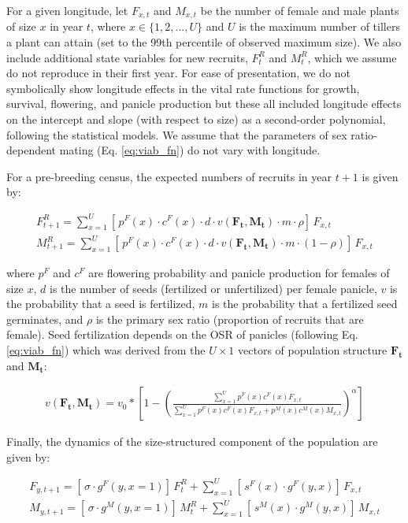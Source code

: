 \documentclass[11pt]{article}\usepackage[]{graphicx}\usepackage[]{color}
\begin{document}
For a given longitude, let $F_{x,t}$ and $M_{x,t}$ be the number of female and male plants of size $x$ in year $t$, where $x \in \{1,2,...,U\}$ and $U$ is the maximum number of tillers a plant can attain (set to the 99th percentile of observed maximum size). 
We also include additional state variables for new recruits, $F^{R}_{t}$ and $M^{R}_{t}$, which we assume do not reproduce in their first year.
For ease of presentation, we do not symbolically show longitude effects in the vital rate functions for growth, survival, flowering, and panicle production but these all included longitude effects on the intercept and slope (with respect to size) as a second-order polynomial, following the statistical models.
We assume that the parameters of sex ratio-dependent mating (Eq. \ref{eq:viab_fn}) do not vary with longitude. 

For a pre-breeding census, the expected numbers of recruits in year $t+1$ is given by:

\begin{align}\label{eq:recruits}
F^{R}_{t+1} = \sum_{x=1}^{U} 	[ \, p^{F}(x) \cdot c^{F}(x) \cdot d \cdot v(\mathbf{F_{t}},\mathbf{M_{t}}) \cdot m \cdot \rho 	] \, F_{x,t}
\\
M^{R}_{t+1} = \sum_{x=1}^{U} 	[ \, p^{F}(x) \cdot c^{F}(x) \cdot d \cdot v(\mathbf{F_{t}},\mathbf{M_{t}}) \cdot m \cdot (1-\rho) 	] \, F_{x,t}
\end{align}

\noindent where $p^{F}$ and $c^{F}$ are flowering probability and panicle production for females of size $x$, $d$ is the number of seeds (fertilized or unfertilized) per female panicle, $v$ is the probability that a seed is fertilized, $m$ is the probability that a fertilized seed germinates, and $\rho$ is the primary sex ratio (proportion of recruits that are female). 
Seed fertilization depends on the OSR of panicles (following Eq. \ref{eq:viab_fn}) which was derived from the $U \times 1$ vectors of population structure $\mathbf{F_{t}}$ and $\mathbf{M_{t}}$:

\begin{align}\label{eq:viab_MPM}
v(\mathbf{F_{t}},\mathbf{M_{t}}) = v_{0} * \left[ 1 - \left( \frac{\sum_{x=1}^{U} p^{F}(x) c^{F}(x) F_{x,t}}{\sum_{x=1}^{U} p^{F}(x) c^{F}(x) F_{x,t} + p^{M}(x) c^{M}(x) M_{x,t}} \right) ^{\alpha}\right]
\end{align}

Finally, the dynamics of the size-structured component of the population are given by:

\begin{align}\label{eq:dynamics}
F_{y,t+1} = [ \, \sigma \cdot g^{F}(y,x=1) ] \, F^{R}_{t} + \sum_{x=1}^{U} 	[ \, s^{F}(x) \cdot g^{F}(y,x)] \, F_{x,t}
\\
M_{y,t+1} = [ \, \sigma \cdot g^{M}(y,x=1) ] \, M^{R}_{t} + \sum_{x=1}^{U} 	[ \,  s^{M}(x) \cdot g^{M}(y,x) ] \, M_{x,t}
\end{align}
\end{document}
